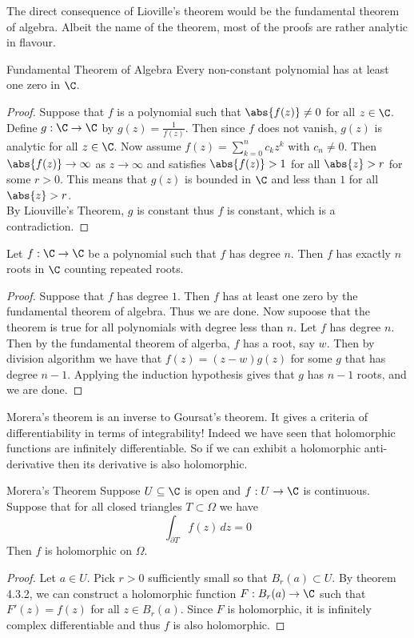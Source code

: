 \documentclass[a4paper]{article}
\begin{document}
The direct consequence of Lioville's theorem would be the fundamental theorem of algebra. Albeit the name of the theorem, most of the proofs are rather analytic in flavour. 

\begin{thm}{Fundamental Theorem of Algebra}{} Every non-constant polynomial has at least one zero in $\C$. 
\begin{proof}
Suppose that $f$ is a polynomial such that $\abs{f(z)}\neq 0$ for all $z\in\C$. Define $g:\C\to\C$ by $g(z)=\frac{1}{f(z)}$. Then since $f$ does not vanish, $g(z)$ is analytic for all $z\in\C$. Now assume $f(z)=\sum_{k=0}^nc_kz^k$ with $c_n\neq 0$. Then $\abs{f(z)}\to\infty$ as $z\to\infty$ and satisfies $\abs{f(z)}>1$ for all $\abs{z}>r$ for some $r>0$. This means that $g(z)$ is bounded in $\C$ and less than $1$ for all $\abs{z}>r$. \\
By Liouville's Theorem, $g$ is constant thus $f$ is constant, which is a contradiction. 
\end{proof}
\end{thm}

\begin{prp}{}{} Let $f:\C\to\C$ be a polynomial such that $f$ has degree $n$. Then $f$ has exactly $n$ roots in $\C$ counting repeated roots. 
\begin{proof}
Suppose that $f$ has degree $1$. Then $f$ has at least one zero by the fundamental theorem of algebra. Thus we are done. Now supoose that the theorem is true for all polynomials with degree less than $n$. Let $f$ has degree $n$. Then by the fundamental theorem of algerba, $f$ has a root, say $w$. Then by division algorithm we have that $f(z)=(z-w)g(z)$ for some $g$ that has degree $n-1$. Applying the induction hypothesis gives that $g$ has $n-1$ roots, and we are done. 
\end{proof}
\end{prp}

Morera's theorem is an inverse to Goursat's theorem. It gives a criteria of differentiability in terms of integrability! Indeed we have seen that holomorphic functions are infinitely differentiable. So if we can exhibit a holomorphic anti-derivative then its derivative is also holomorphic. 

\begin{thm}{Morera's Theorem}{} Suppose $U\subseteq\C$ is open and $f:U\to\C$ is continuous. Suppose that for all closed triangles $T\subset\Omega$ we have $$\int_{\partial T}f(z)\,dz=0$$ Then $f$ is holomorphic on $\Omega$. 
\begin{proof}
Let $a\in U$. Pick $r>0$ sufficiently small so that $B_r(a)\subset U$. By theorem 4.3.2, we can construct a holomorphic function $F:B_r(a)\to\C$ such that $F'(z)=f(z)$ for all $z\in B_r(a)$. Since $F$ is holomorphic, it is infinitely complex differentiable and thus $f$ is also holomorphic. 
\end{proof}
\end{thm}
\end{document}
